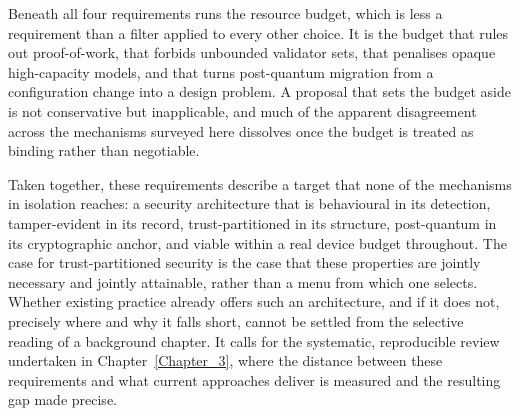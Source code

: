 Beneath all four requirements runs the resource budget, which is less a
requirement than a filter applied to every other choice. It is the budget that
rules out proof-of-work, that forbids unbounded validator sets, that penalises
opaque high-capacity models, and that turns post-quantum migration from a
configuration change into a design problem. A proposal that sets the budget aside
is not conservative but inapplicable, and much of the apparent disagreement
across the mechanisms surveyed here dissolves once the budget is treated as
binding rather than negotiable.

Taken together, these requirements describe a target that none of the
mechanisms in isolation reaches: a security architecture that is behavioural in
its detection, tamper-evident in its record, trust-partitioned in its structure,
post-quantum in its cryptographic anchor, and viable within a real device budget
throughout. The case for trust-partitioned security is the case that these
properties are jointly necessary and jointly attainable, rather than a menu from
which one selects. Whether existing practice already offers such an
architecture, and if it does not, precisely where and why it falls short, cannot
be settled from the selective reading of a background chapter. It calls for the
systematic, reproducible review undertaken in Chapter~\ref{Chapter_3}, where the
distance between these requirements and what current approaches deliver is
measured and the resulting gap made precise.
